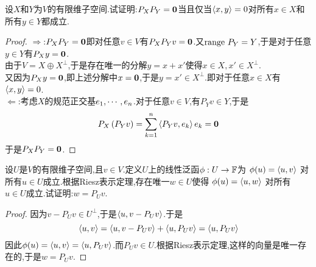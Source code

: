 \documentclass{ctexart}
\begin{document}
\begin{problem}[7.]
    设$X$和$Y$为$V$的有限维子空间.试证明:$P_XP_Y=\mathbf0$当且仅当$\left\langle{x},{y}\right\rangle=0$对所有$x\in X$和所有$y\in Y$都成立.
\end{problem}
\begin{proof}
    $\Rightarrow$:$P_XP_Y=\mathbf0$即对任意$v\in V$有$P_XP_Yv=\mathbf0$.又$\text{range } P_Y=Y$,于是对于任意$y\in Y$有$P_Xy=\mathbf0$.\\
    由于$V=X\oplus X^\bot$,于是存在唯一的分解$y=x+x'$使得$x\in X,x'\in X^\bot$.\\
    又因为$P_Xy=\mathbf0$,即上述分解中$x=\mathbf0$,于是$y=x'\in X^\bot$.即对于任意$x\in X$有$\left\langle{x},{y}\right\rangle=0$.\\
    $\Leftarrow$:考虑$X$的规范正交基${e}_1,\cdots,{e}_{n}$.对于任意$v\in V$,有$P_Yv\in Y$,于是
    \[P_X\left(P_Yv\right)=\sum_{k=1}^{n}\left\langle{P_Yv},{e_k}\right\rangle e_k=\mathbf0\]
    于是$P_XP_Y=\mathbf0$.
\end{proof}
\begin{problem}[8.]
    设$U$是$V$的有限维子空间,且$v\in V$.定义$U$上的线性泛函$\phi:U\to\mathbb{F}$为
    \(\phi(u)=\left\langle{u},{v}\right\rangle\)
    对所有$u\in U$成立.根据Riesz表示定理,存在唯一$w\in U$使得
    \(\phi(u)=\left\langle{u},{w}\right\rangle\)
    对所有$u\in U$成立.试证明:$w=P_Uv$.
\end{problem}
\begin{proof}
    因为$v-P_Uv\in U^\bot$,于是$\left\langle{u},{v-P_Uv}\right\rangle$.于是
    \[\left\langle{u},{v}\right\rangle=\left\langle{u},{v-P_Uv}\right\rangle+\left\langle{u},{P_Uv}\right\rangle=\left\langle{u},{P_Uv}\right\rangle\]
    因此$\phi(u)=\left\langle{u},{v}\right\rangle=\left\langle{u},{P_Uv}\right\rangle$.而$P_Uv\in U$.根据Riesz表示定理,这样的向量是唯一存在的,于是$w=P_Uv$.
\end{proof}
\end{document}

